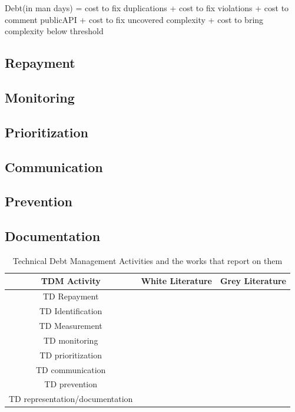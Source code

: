 Debt(in man days) = cost to fix duplications + cost to fix violations + cost to comment publicAPI + cost to fix uncovered complexity + cost to bring complexity below threshold

\subsection{Repayment}

\subsection{Monitoring}
\subsection{Prioritization}
\subsection{Communication}
\subsection{Prevention}
\subsection{Documentation}

\begin{table}[h!]
    
\centering
\begin{tabular}{|c|c|c|}
    \hline
    TDM Activity & White Literature & Grey Literature \\ \hline
    TD Repayment & ~\cite{10.1145/3084226.3084248, 10.1145/3387906.3388623} &  \\ \hline
    TD Identification & ~\cite{Klotins2018/3183519.3183539, CicoTradeoffs} & \\ \hline
    TD Measurement & & ~\cite{Qualityv77:online, Whopayso60:online}\\ \hline
    TD monitoring & ~\cite{Besker2018} & \\ \hline
 TD prioritization &  ~\cite{9820390} & ~\cite{techolut25:online, HowtoGet43:online}\\ \hline
TD communication & & ~\cite{FowlerBottlenecks} \\ \hline
TD prevention & ~\cite{SanchezGordon2016} & ~\cite{Creating18:online}\\ \hline
TD representation/documentation & ~\cite{Chicote:2017} & \\ \hline
    \end{tabular}

\caption{Technical Debt Management Activities and the works that report on them}
  \label{tab:TDMactivities}
\end{table}

